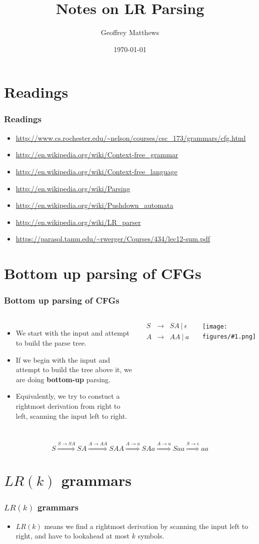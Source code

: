 \documentclass{beamer}
\title[Notes on LR Parsing]
{
 Notes on LR  Parsing
}
\subtitle{} %
\author[Geoffrey Matthews]
{Geoffrey Matthews}
\institute[WWU/CS]
{
  Department of Computer Science\\
  Western Washington University
}
\date{\today}
\newcommand{\sect}[1]{
\section{#1}
\begin{frame}[fragile]\frametitle{#1}
}
\newcommand{\myfig}[1]{\centerline{\texttt{[image: figures/\#1.png]}}}
\newcommand{\arr}{&\rightarrow&}
\newcommand{\ar}{\ensuremath{\rightarrow}}
\newcommand{\bee}{\begin{eqnarray*}}
\newcommand{\eee}{\end{eqnarray*}}
\newcommand{\mt}{\ensuremath{\epsilon}}
\newcommand{\deriv}[1]{\ensuremath{\stackrel{#1}{\Longrightarrow}}}
\newcommand{\bi}{\begin{itemize}}
\newcommand{\li}{\item}
\newcommand{\ei}{\end{itemize}}
\begin{document}
\begin{frame}
  \titlepage
\end{frame}


\newcommand{\myref}[1]{\small\item\url{#1}}
\newcommand{\myreft}[1]{\footnotesize\item\url{#1}}


\sect{Readings}

\begin{itemize}

\myreft{http://www.cs.rochester.edu/~nelson/courses/csc_173/grammars/cfg.html}

\myreft{http://en.wikipedia.org/wiki/Context-free_grammar}

\myreft{http://en.wikipedia.org/wiki/Context-free_language}
\myreft{http://en.wikipedia.org/wiki/Parsing}

\myreft{http://en.wikipedia.org/wiki/Pushdown_automata}
\myreft{http://en.wikipedia.org/wiki/LR_parser}
\myreft{https://parasol.tamu.edu/~rwerger/Courses/434/lec12-sum.pdf}
\end{itemize}

\end{frame}

\sect{Bottom up parsing of CFGs}
\begin{columns}
\bi
\li We start with the input and attempt to build the parse tree.
\li If we begin with the input and attempt to build the tree 
above it, we are doing {\bf bottom-up} parsing.
\li Equivalently, we try to constuct a rightmost derivation from right
to left, scanning the input left to right.
\ei
{}
\bee
S \arr SA\ | \ \mt\\
A \arr AA\ | \ a
\eee
\myfig{derivationtreelr}
\end{columns}
\vfill
\[
S \deriv{S\ar SA} SA \deriv{A\ar AA} SAA \deriv{A\ar a} SAa \deriv{A\ar a} Saa \deriv{S\ar\epsilon} aa
\]
\end{frame}


\sect{$LR(k)$ grammars}
\bi
\li $LR(k)$ means we find a rightmost derivation by scanning the input
left to right, and have to lookahead at most $k$ symbols.
\ei
\end{frame}
\end{document}
